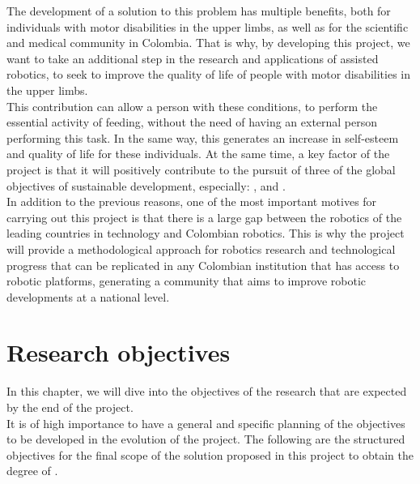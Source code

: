 \documentclass[11pt]{report} %
\begin{document}
The development of a solution to this problem has multiple benefits, both for individuals with motor disabilities in the upper limbs, as well as for the scientific and medical community in Colombia. That is why, by developing this project, we want to take an additional step in the research and applications of assisted robotics, to seek to improve the quality of life of people with motor disabilities in the upper limbs.\\

This contribution can allow a person with these conditions, to perform the essential activity of feeding, without the need of having an external person performing this task. In the same way, this generates an increase in self-esteem and quality of life for these individuals.
At the same time, a key factor of the project is that it will positively contribute to the pursuit of three of the global objectives of sustainable development, especially: ,  and  \citep{cite_united_nations_sustainable_development}.\\

In addition to the previous reasons, one of the most important motives for carrying out this project is that there is a large gap between the robotics of the leading countries in technology and Colombian robotics. This is why the project will provide a methodological approach for robotics research and technological progress that can be replicated in any Colombian institution that has access to robotic platforms, generating a community that aims to improve robotic developments at a national level.\\



\newpage

\section{Research objectives}

In this chapter, we will dive into the objectives of the research that are expected by the end of the project.\\

It is of high importance to have a general and specific planning of the objectives to be developed in the evolution of the project. The following are the structured objectives for the final scope of the solution proposed in this project to obtain the degree of .\\
\end{document}

